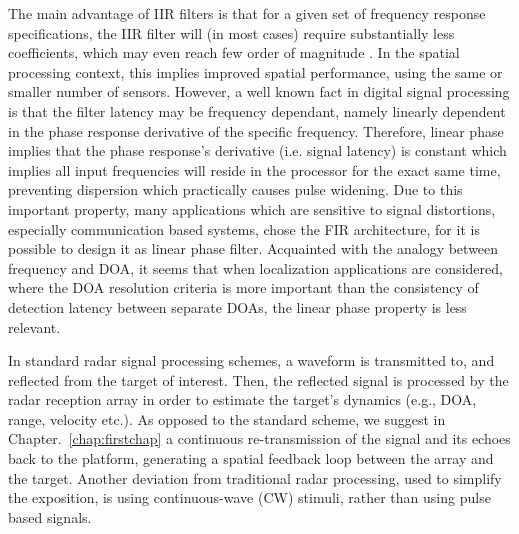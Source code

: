 The main advantage of IIR filters is that for a given set of frequency response specifications, the IIR filter will (in most cases) require substantially less coefficients, which may even reach few order of magnitude \cite{rabiner1974some}.
In the spatial processing context, this implies improved spatial performance, using the same or smaller number of sensors.
However, a well known \cite{oppenheim1975digital} fact in digital signal processing is that the filter latency may be frequency dependant, namely linearly dependent in the phase response derivative of the specific frequency.
Therefore, linear phase implies that the phase response's derivative (i.e. signal latency) is constant which implies all input frequencies will reside in the processor for the exact same time, preventing dispersion which practically causes pulse widening.
Due to this important property, many applications which are sensitive to signal distortions, especially communication based systems, chose the FIR architecture, for it is possible to design it as linear phase filter.
Acquainted with the analogy between frequency and DOA, it seems that when localization applications are considered, where the DOA resolution criteria is more important than the consistency of detection latency between separate DOAs, the linear phase property is less relevant.
\par In standard radar signal processing schemes, a waveform is transmitted to, and reflected from the target of interest. Then, the reflected signal is processed by the radar reception array in order to estimate the target's dynamics (e.g., DOA, range, velocity etc.).
As opposed to the standard scheme, we suggest in Chapter.~\ref{chap:firstchap} a continuous re-transmission of the signal and its echoes back to the platform, generating a spatial feedback loop between the array and the target.
Another deviation from traditional radar processing, used to simplify the exposition, is using continuous-wave (CW) stimuli, rather than using pulse based signals.